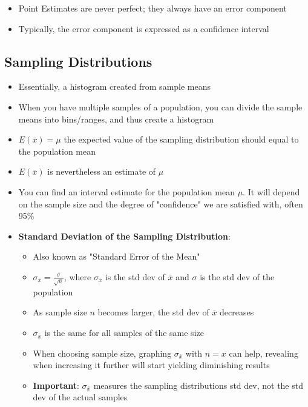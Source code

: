 \documentclass{article}
\begin{document}
\begin{itemize}
    \item Point Estimates are never perfect; they always have an error component
    \item Typically, the error component is expressed as a confidence interval
\end{itemize}

\subsection{Sampling Distributions}

\begin{itemize}
    \item Essentially, a histogram created from sample means
    \item When you have multiple samples of a population, you can divide the sample means into bins/ranges, and thus create a histogram
    \item $E(\bar{x})=\mu$ the expected value of the sampling distribution should equal to the population mean
    \item $E(\bar{x})$ is nevertheless an estimate of $\mu$
    \item You can find an interval estimate for the population mean $\mu$. It will depend on the sample size and the degree of "confidence" we are satisfied with, often 95\%
    \item \textbf{Standard Deviation of the Sampling Distribution}:
    \begin{itemize}
        \item Also known as "Standard Error of the Mean"
        \item $\sigma_{\bar{x}}=\frac{\sigma}{\sqrt{n}}$, where $\sigma_{\bar{x}}$ is the std dev of $\bar{x}$ and $\sigma$ is the std dev of the population
        \item As sample size $n$ becomes larger, the std dev of $\bar{x}$ decreases
        \item $\sigma_{\bar{x}}$ is the same for all samples of the same size
        \item When choosing sample size, graphing $\sigma_{\bar{x}}$ with $n=x$ can help, revealing when increasing it further will start yielding diminishing results
        \item \textbf{Important}: $\sigma_{\bar{x}}$ measures the sampling distributions std dev, not the std dev of the actual samples
    \end{itemize}
\end{itemize}
\end{document}
